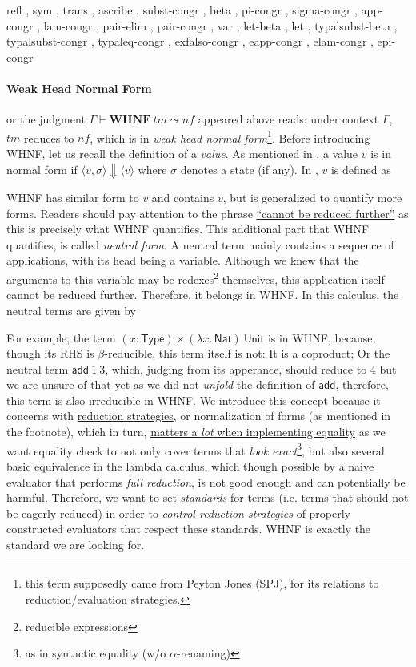 \documentclass[a4paper, 11pt]{article}
\theoremstyle{remark}\newtheorem*{remark}{Remark}
\theoremstyle{definition}\newtheorem*{definition}{Definition}
\begin{document}
{ refl
, sym
, trans
, ascribe
, subst-congr
, beta
, pi-congr
, sigma-congr
, app-congr
, lam-congr
, pair-elim
, pair-congr
, var
, let-beta
, let
, typalsubst-beta
, typalsubst-congr
, typaleq-congr
, exfalso-congr
, eapp-congr
, elam-congr
, epi-congr}

\paragraph{Weak Head Normal Form}
or the judgment $\Gamma\vdash\mathbf{WHNF}\ tm\leadsto nf$ appeared above
reads: under context $\Gamma$, $tm$ reduces to $nf$, which is
in \emph{weak head normal form}\footnote{
this term supposedly came from Peyton Jones (SPJ), for its relations to reduction/evaluation strategies.
}. Before introducing WHNF, let us recall the definition of a \emph{value}. As mentioned in \Tigris,
a value $v$ is in normal form if $\langle v, \sigma\rangle\Downarrow\langle v\rangle$ where $\sigma$ denotes a state (if any).
In \Tigrisd, $v$ is defined as


WHNF has similar form to $v$ and contains $v$, but is generalized to quantify more forms.
Readers should pay attention to the phrase \underline{``cannot be reduced further''} as this
is precisely what WHNF quantifies.
This additional part that WHNF quantifies, is called \emph{neutral form}. A neutral term mainly
contains a sequence of applications, with its head being a variable.
Although we knew that the arguments to this variable
may be redexes\footnote{reducible expressions} themselves, this application itself
cannot be reduced further. Therefore, it belongs in WHNF. In this calculus, the neutral
terms are given by


For example, the term
$(x : \mathsf{Type})\times (\lambda x.\,\mathsf{Nat})\ \mathsf{Unit}$ is in WHNF,
because, though its RHS is $\beta$-reducible, this term itself is not: It is
a coproduct; Or the neutral term $\mathsf{add}\ 1\ 3$, which,
judging from its apperance, should reduce to $4$ but
we are unsure of that
yet as we did not \emph{unfold} the definition of $\mathsf{add}$,
therefore, this term is also irreducible in WHNF.
We introduce this concept because
it concerns
with \underline{reduction strategies}, or normalization of forms (as mentioned in the footnote), which
in turn, \underline{matters a \emph{lot} when implementing equality} as
we want equality check to not only cover terms
that \emph{look exact}\footnote{
as in syntactic equality (w/o $\alpha$-renaming)
}, but also several basic equivalence in the lambda calculus, which
though possible by a naive evaluator that performs \emph{full reduction}, is not good enough and
can potentially be harmful.
Therefore, we want to set \emph{standards}
for terms (i.e. terms that should \underline{not} be eagerly reduced) in order to
\emph{control reduction strategies} of properly constructed evaluators
that respect these standards. WHNF is exactly the standard we are looking for.
\end{document}
